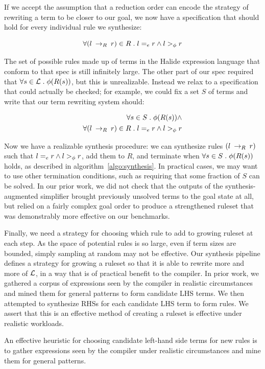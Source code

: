 If we accept the assumption that a reduction order can encode the strategy of rewriting a term to be closer to our goal, we now have a specification that should hold for every individual rule we synthesize:

\[ \forall (l \:\rightarrow_{R}\: r) \in R \;.\; l =_e r \wedge l >_{\phi} r
\]

The set of possible rules made up of terms in the Halide expression language that conform to that spec is still infinitely large. The other part of our spec required that $\forall s \in \mathcal{L} \;.\; \phi(R(s))$, but this is unrealizable. Instead we relax to a specification that could actually be checked; for example, we could fix a set $S$ of terms and write that our term rewriting system should:

\begin{align*}
    \forall s \in S \;.\; \phi(R(s)) \wedge \\
    \forall (l \:\rightarrow_{R}\: r) \in R \;.\; l =_e r \wedge l >_{\phi} r
\end{align*}

Now we have a realizable synthesis procedure: we can synthesize rules $(l \:\rightarrow_{R}\: r)$ such that $l =_e r \wedge l >_{\phi} r$, add them to $R$, and terminate when $\forall s \in S \;.\; \phi(R(s))$ holds, as described in algorithm~\ref{algo:synthesis}. In practical cases, we may want to use other termination conditions, such as requiring that some fraction of $S$ can be solved. In our prior work, we did not check that the outputs of the synthesis-augmented simplifier brought previously unsolved terms to the goal state at all, but relied on a fairly complex goal order to produce a strengthened ruleset that was demonstrably more effective on our benchmarks.

Finally, we need a strategy for choosing which rule to add to growing ruleset at each step. As the space of potential rules is so large, even if term sizes are bounded, simply sampling at random may not be effective. Our synthesis pipeline defines a strategy for growing a ruleset so that it is able to rewrite more and more of $\mathcal{L}$, in a way that is of practical benefit to the compiler. In prior work, we gathered a corpus of expressions seen by the compiler in realistic circumstances and mined them for general patterns to form candidate LHS terms. We then attempted to synthesize RHSs for each candidate LHS term to form rules. We assert that this is an effective method of creating a ruleset is effective under realistic workloads.

\begin{assumption}
An effective heuristic for choosing candidate left-hand side terms for new rules is to gather expressions seen by the compiler under realistic circumstances and mine them for general patterns.
\end{assumption}

